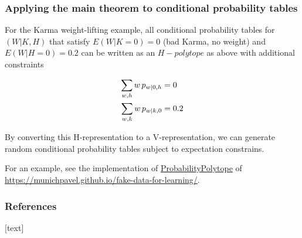 \begin{frame}
  \frametitle{Applying the main theorem to conditional probability tables}
For the Karma weight-lifting example, all conditional probability tables for $(W | K, H)$ that satisfy $E(W | K = 0) = 0$ (bad Karma, no weight) and $E(W | H = 0)=0.2$ can be written as an $H-polytope$ as above with additional constraints

\begin{align*}
\sum_{w, h} w \, p_{w | 0, h} &= 0\\
\sum_{w, k} w \, p_{w | k, 0} & = 0.2\newline
\end{align*}

By converting this H-representation to a V-representation, we can generate random conditional probability tables subject to expectation constrains.\newline

For an example, see the implementation of \href{https://munichpavel.github.io/fake-data-docs/html/\_modules/fake\_data\_for\_learning/utils.html\#ProbabilityPolytope}{ProbabilityPolytope} of \href{https://munichpavel.github.io/fake-data-for-learning/}{https://munichpavel.github.io/fake-data-for-learning/}.

\end{frame}


\begin{frame}[allowframebreaks]
    \frametitle{References}
    [text]
    
    
\end{frame}

